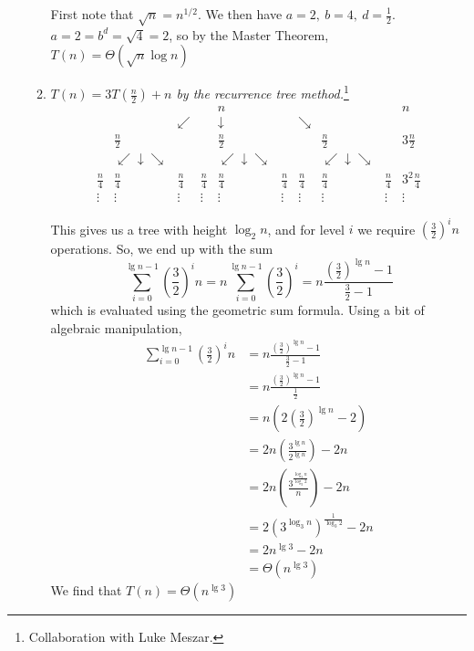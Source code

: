 \documentclass[12pt]{article}
\begin{document}
\begin{enumerate}
\begin{enumerate}
    First note that $\sqrt{n} = n^{1/2}$. We then have $a = 2,\ b = 4,\ d = \frac{1}{2}$. $a = 2 = b^d = \sqrt{4} = 2$, so by the Master Theorem, $\boxed{T(n) = \Theta(\sqrt{n} \log n)}$
    
    \item \textit{$T(n) = 3T(\frac{n}{2}) + n$ by the recurrence tree method.}\footnote{Collaboration with Luke Meszar.}
    \[
    \begin{array}{ccccccccc|c}
    &&&&n&&&&&n\\
    &&\swarrow&&\downarrow&&\searrow&&&\\
    &\frac{n}{2}&&&\frac{n}{2}&&&\frac{n}{2}&&3\frac{n}{2}\\
    &\swarrow  \downarrow  \searrow &&& \swarrow  \downarrow  \searrow &&& \swarrow  \downarrow  \searrow & \\
    \frac{n}{4}&\frac{n}{4}&\frac{n}{4}&\frac{n}{4}&\frac{n}{4}&\frac{n}{4}&\frac{n}{4}&\frac{n}{4}&\frac{n}{4}&3^2\frac{n}{4}\\
    \vdots &\vdots &\vdots &\vdots &\vdots &\vdots &\vdots &\vdots &\vdots &\vdots
    \end{array}
    \]
    
    This gives us a tree with height $\log_2 n$, and for level $i$ we require $\left(\frac{3}{2}\right)^in$ operations. So, we end up with the sum
    \[
    \sum_{i=0}^{\lg n - 1} \left(\frac{3}{2}\right)^i n = n \sum_{i=0}^{\lg n - 1} \left(\frac{3}{2}\right)^i = n\frac{\left(\frac{3}{2}\right)^{\lg n} - 1}{\frac{3}{2} - 1}
    \]
    which is evaluated using the geometric sum formula. Using a bit of algebraic manipulation, \\
    \begin{align*}
    \sum_{i=0}^{\lg n - 1} \left(\frac{3}{2}\right)^i n &= n\frac{\left(\frac{3}{2}\right)^{\lg n} - 1}{\frac{3}{2} - 1}\\
    &= n\frac{\left(\frac{3}{2}\right)^{\lg n} - 1}{\frac{1}{2}}\\
    &= n\left(2\left(\frac{3}{2}\right)^{\lg n} - 2\right)\\
    &= 2n\left(\frac{3^{\lg n}}{2^{\lg n}}\right) - 2n\\
    &= 2n\left(\frac{3^{\frac{\log_3 n}{\log_3 2}}}{n}\right) - 2n\\
    &= 2\left( 3^{\log_3 n}\right)^{\frac{1}{\log_3 2}} - 2n\\
    &= 2n^{\lg 3} - 2n\\
    &= \Theta\left(n^{\lg 3}\right)
    \end{align*}
    We find that $\boxed{T(n) = \Theta\left(n^{\lg 3}\right)}$
    

\end{enumerate}
\end{enumerate}
\end{document}
